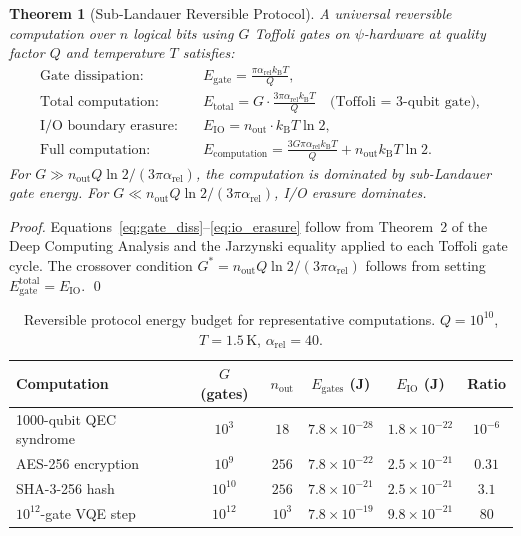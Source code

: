 \documentclass[11pt]{article}
\newtheorem{theorem}{Theorem}[section]
\theoremstyle{definition}
\theoremstyle{remark}
\newcommand{\kB}{k_{\mathrm{B}}}
\newcommand{\arel}{\alpha_{\mathrm{rel}}}
\begin{document}
\begin{theorem}[Sub-Landauer Reversible Protocol]
\label{thm:reversible_protocol}
A universal reversible computation over $n$ logical bits using $G$ Toffoli
gates on $\psi$-hardware at quality factor $Q$ and temperature $T$ satisfies:
\begin{align}
\text{Gate dissipation:}&\quad
E_{\mathrm{gate}} = \frac{\pi\arel\kB T}{Q}, \label{eq:gate_diss} \\
\text{Total computation:}&\quad
E_{\mathrm{total}} = G\cdot\frac{3\pi\arel\kB T}{Q}
\quad\text{(Toffoli = 3-qubit gate)}, \label{eq:total_diss} \\
\text{I/O boundary erasure:}&\quad
E_{\mathrm{IO}} = n_{\mathrm{out}}\cdot\kB T\ln 2, \label{eq:io_erasure} \\
\text{Full computation:}&\quad
E_{\mathrm{computation}} = \frac{3G\pi\arel\kB T}{Q}
+ n_{\mathrm{out}}\kB T\ln 2. \label{eq:full_computation}
\end{align}
For $G\gg n_{\mathrm{out}}Q\ln 2/(3\pi\arel)$, the computation is
dominated by sub-Landauer gate energy. For $G\ll n_{\mathrm{out}}Q\ln 2/(3\pi\arel)$,
I/O erasure dominates.
\end{theorem}

\begin{proof}
Equations~\eqref{eq:gate_diss}--\eqref{eq:io_erasure} follow from Theorem~2
of the Deep Computing Analysis and the Jarzynski equality applied to each
Toffoli gate cycle. The crossover condition $G^* = n_{\mathrm{out}}Q\ln 2/(3\pi\arel)$
follows from setting $E_{\mathrm{gate}}^{\mathrm{total}} = E_{\mathrm{IO}}$. \qed
\end{proof}

\begin{table}[h]
\centering
\caption{Reversible protocol energy budget for representative computations.
$Q=10^{10}$, $T=1.5\,\mathrm{K}$, $\arel=40$.}
\label{tab:reversible_budget}
\begin{tabular}{@{}lccccc@{}}
\toprule
Computation & $G$ (gates) & $n_{\mathrm{out}}$ & $E_{\mathrm{gates}}$ (J) &
$E_{\mathrm{IO}}$ (J) & Ratio \\
\midrule
1000-qubit QEC syndrome & $10^3$ & $18$ & $7.8\times10^{-28}$ &
$1.8\times10^{-22}$ & $10^{-6}$ \\
AES-256 encryption & $10^9$ & $256$ & $7.8\times10^{-22}$ &
$2.5\times10^{-21}$ & $0.31$ \\
SHA-3-256 hash & $10^{10}$ & $256$ & $7.8\times10^{-21}$ &
$2.5\times10^{-21}$ & $3.1$ \\
$10^{12}$-gate VQE step & $10^{12}$ & $10^3$ & $7.8\times10^{-19}$ &
$9.8\times10^{-21}$ & $80$ \\
\bottomrule
\end{tabular}
\end{table}
\end{document}
